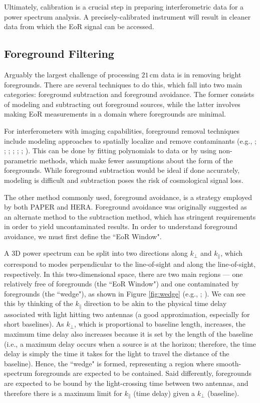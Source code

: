 Ultimately, calibration is a crucial step in preparing interferometric data for a power spectrum analysis. A precisely-calibrated instrument will result in cleaner data from which the EoR signal can be accessed.

\subsection{Foreground Filtering}

Arguably the largest challenge of processing $21$\,cm data is in removing bright foregrounds. There are several techniques to do this, which fall into two main categories: foreground subtraction and foreground avoidance. The former consists of modeling and subtracting out foreground sources, while the latter involves making EoR measurements in a domain where foregrounds are minimal. 

For interferometers with imaging capabilities, foreground removal techniques include modeling approaches to spatially localize and remove contaminants (e.g., \citealt{santos_et_al2005}; \citealt{wang_et_al2006}; \citealt{jelic_et_al2008}; \citealt{liu_et_al2009}; \citealt{bowman_et_al2009}; \citealt{harker_et_al2009}; \citealt{chapman_et_al2016}). This can be done by fitting polynomials to data or by using non-parametric methods, which make fewer assumptions about the form of the foregrounds. While foreground subtraction would be ideal if done accurately, modeling is difficult and subtraction poses the risk of cosmological signal loss.

The other method commonly used, foreground avoidance, is a strategy employed by both PAPER and HERA. Foreground avoidance was originally suggested as an alternate method to the subtraction method, which has stringent requirements in order to yield uncontaminated results. In order to understand foreground avoidance, we must first define the ``EoR Window".

A 3D power spectrum can be split into two directions along $k_{\perp}$ and $k_{\parallel}$, which correspond to modes perpendicular to the line-of-sight and along the line-of-sight, respectively. In this two-dimensional space, there are two main regions --- one relatively free of foregrounds (the ``EoR Window") and one contaminated by foregrounds (the ``wedge"), as shown in Figure \ref{fig:wedge} (e.g., \citealt{datta_et_al2010}; \citealt{vedantham_et_al2012}). We can see this by thinking of the $k_{\parallel}$ direction to be akin to the physical time delay associated with light hitting two antennas (a good approximation, especially for short baselines). As $k_{\perp}$, which is proportional to baseline length, increases, the maximum time delay also increases because it is set by the length of the baseline (i.e., a maximum delay occurs when a source is at the horizon; therefore, the time delay is simply the time it takes for the light to travel the distance of the baseline). Hence, the ``wedge" is formed, representing a region where smooth-spectrum foregrounds are expected to be contained. Said differently, foregrounds are expected to be bound by the light-crossing time between two antennas, and therefore there is a maximum limit for $k_{\parallel}$ (time delay) given a $k_{\perp}$ (baseline). 

